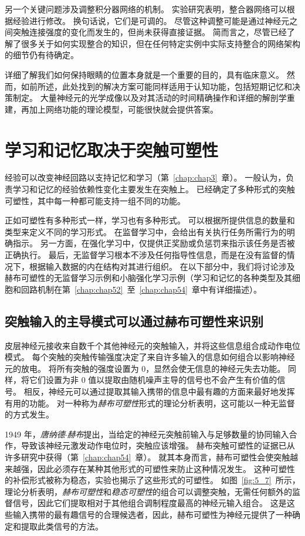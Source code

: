 另一个关键问题涉及调整积分器网络的机制。
实验研究表明，整合器网络可以根据经验进行修改。
换句话说，它们是可调的。 
尽管这种调整可能是通过神经元之间突触连接强度的变化而发生的，但尚未获得直接证据。 
简而言之，尽管已经了解了很多关于如何实现整合的知识，但在任何特定实例中实际支持整合的网络架构的细节仍有待确定。


详细了解我们如何保持眼睛的位置本身就是一个重要的目的，具有临床意义。 
然而，如前所述，此处找到的解决方案可能同样适用于认知功能，包括短期记忆和决策制定。
大量神经元的光学成像以及对其活动的时间精确操作和详细的解剖学重建，再加上网络功能的理论模型，可能很快就会提供答案。



\section{学习和记忆取决于突触可塑性}

经验可以改变神经回路以支持记忆和学习（第~\ref{chap:chap3}~章）。
一般认为，负责学习和记忆的经验依赖性变化主要发生在突触上。
已经确定了多种形式的突触可塑性，其中每一种都可能支持一组不同的功能。


正如可塑性有多种形式一样，学习也有多种形式。
可以根据所提供信息的数量和类型来定义不同的学习形式。
在监督学习中，会给出有关执行任务所需行为的明确指示。
另一方面，在强化学习中，仅提供正奖励或负惩罚来指示该任务是否被正确执行。
最后，无监督学习根本不涉及任何指导性信息，而是在没有监督的情况下，根据输入数据的内在结构对其进行组织。
在以下部分中，我们将讨论涉及赫布可塑性的无监督学习示例和小脑强化学习示例（学习和记忆的各种类型及其细胞和回路机制在第~\ref{chap:chap52}~至~\ref{chap:chap54}~章中有详细描述）。



\subsection{突触输入的主导模式可以通过赫布可塑性来识别}

皮层神经元接收来自数千个其他神经元的突触输入，并将这些信息组合成动作电位模式。
每个突触的突触传输强度决定了来自许多输入的信息如何组合以影响神经元的放电。
将所有突触的强度设置为 0，显然会使无信息的神经元失去功能。
同样，将它们设置为非 0 值以提取由随机噪声主导的信号也不会产生有价值的信号。
相反，神经元可以通过提取其输入携带的信息中最有趣的方面来最好地发挥有用的功能。
对一种称为\textit{赫布可塑性}形式的理论分析表明，这可能以一种无监督的方式发生。


1949 年，\textit{唐纳德$\cdot$赫布}提出，当给定的神经元突触前输入与足够数量的协同输入合作，导致该神经元激发动作电位时，突触应该增强。
赫布突触可塑性的证据已从许多研究中获得（第~\ref{chap:chap54}~章）。 
就其本身而言，赫布可塑性会使突触越来越强，因此必须存在某种其他形式的可塑性来防止这种情况发生。 
这种可塑性的补偿形式被称为稳态，实验也揭示了这些形式的可塑性。 
如图~\ref{fig:5_7}~所示，理论分析表明，\textit{赫布可塑性}和\textit{稳态可塑性}的组合可以调整突触，无需任何额外的监督信号，因此它们提取相对于其他组合调制程度最高的神经元输入组合。
这是这些输入携带的最有趣信号的合理候选者，因此，赫布可塑性为神经元提供了一种确定和提取此类信号的方法。


